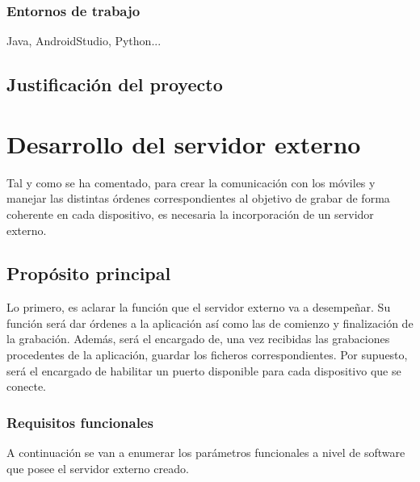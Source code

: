 \documentclass[a4paper,11pt]{book}
\begin{document}
		\subsection{Entornos de trabajo}
		Java, AndroidStudio, Python...
		
	\section{Justificación del proyecto}

\chapter{Desarrollo del servidor externo}
	Tal y como se ha comentado, para crear la comunicación con los móviles y manejar las distintas órdenes correspondientes al objetivo de grabar de forma coherente en cada dispositivo, es necesaria la incorporación de un servidor externo.
	
	
		\section{Propósito principal}
			Lo primero, es aclarar la función que el servidor externo va a desempeñar. Su función será dar órdenes a la aplicación así como las de comienzo y finalización de la grabación. Además, será el encargado de, una vez recibidas las grabaciones procedentes de la aplicación, guardar los ficheros correspondientes. Por supuesto, será el encargado de habilitar un puerto disponible para cada dispositivo que se conecte.
			
			
			\subsection{Requisitos funcionales}
				A continuación se van a enumerar los parámetros funcionales a nivel de software que posee el servidor externo creado.
				
\end{document}
